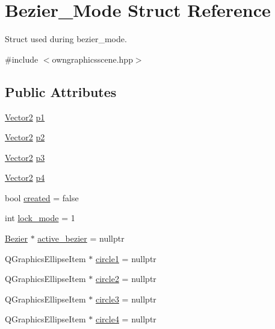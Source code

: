 \hypertarget{structBezier__Mode}{}\section{Bezier\+\_\+\+Mode Struct Reference}
\label{structBezier__Mode}


Struct used during bezier\+\_\+mode.  




{\ttfamily \#include $<$owngraphicsscene.\+hpp$>$}

\subsection*{Public Attributes}
\begin{DoxyCompactItemize}
\item 
\mbox{\hyperlink{classVector2}{Vector2}} \mbox{\hyperlink{structBezier__Mode_a2d7c5ccccb03114fd1b26a20843a59e4}{p1}}
\item 
\mbox{\hyperlink{classVector2}{Vector2}} \mbox{\hyperlink{structBezier__Mode_a96ed0f4076e540e5a8789f25f9bf65e9}{p2}}
\item 
\mbox{\hyperlink{classVector2}{Vector2}} \mbox{\hyperlink{structBezier__Mode_ad9fbff84a5248923ceb29433dc58f49b}{p3}}
\item 
\mbox{\hyperlink{classVector2}{Vector2}} \mbox{\hyperlink{structBezier__Mode_a5a3df46137ba62eaf3f9c0ad1ee391ef}{p4}}
\item 
bool \mbox{\hyperlink{structBezier__Mode_ae2573f8601e7d9f439d2bfbc11c34ae9}{created}} = false
\item 
int \mbox{\hyperlink{structBezier__Mode_afdb33ea2b7dc22c264580b86e5e9e998}{lock\+\_\+mode}} = 1
\item 
\mbox{\hyperlink{classBezier}{Bezier}} $\ast$ \mbox{\hyperlink{structBezier__Mode_a9aefbd869ef59854732e405886d334fb}{active\+\_\+bezier}} = nullptr
\item 
Q\+Graphics\+Ellipse\+Item $\ast$ \mbox{\hyperlink{structBezier__Mode_ab07833315488dc0d3c6f613c51de1d3f}{circle1}} = nullptr
\item 
Q\+Graphics\+Ellipse\+Item $\ast$ \mbox{\hyperlink{structBezier__Mode_a3f6f2bdade3db15c0855820d86a5b98e}{circle2}} = nullptr
\item 
Q\+Graphics\+Ellipse\+Item $\ast$ \mbox{\hyperlink{structBezier__Mode_a342d3b970c6049b615ef356a902c0781}{circle3}} = nullptr
\item 
Q\+Graphics\+Ellipse\+Item $\ast$ \mbox{\hyperlink{structBezier__Mode_a6f26e1fe7da425063b792dab9f3c1099}{circle4}} = nullptr
\end{DoxyCompactItemize}


